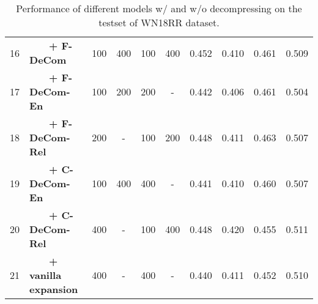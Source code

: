 \documentclass[letterpaper]{article} \usepackage{aaai20}  \usepackage{times}  \usepackage{helvet} \usepackage{courier}  \usepackage{booktabs}
\begin{document}
\begin{table*}[t]
\begin{tabular}{|c|l|cccc|cccc|}
         16 &~~~~\textbf{+ F-DeCom} & 100 & 400 & 100 & 400 & 0.452 & 0.410 & 0.461 & 0.509\\
         17 &~~~~\textbf{+ F-DeCom-En} & 100 & 200 & 200 & - & 0.442 & 0.406 & 0.461 & 0.504\\
         18 &~~~~\textbf{+ F-DeCom-Rel} & 200 & - & 100 & 200 & 0.448 & 0.411 & 0.463 & 0.507\\
         19 &~~~~\textbf{+ C-DeCom-En} & 100 & 400 & 400 & - & 0.441 & 0.410 & 0.460 & 0.507\\
         20 &~~~~\textbf{+ C-DeCom-Rel} & 400 & - & 100 & 400 & 0.448 & 0.420 & 0.455 & 0.511\\
         21 &~~~~\textbf{+ vanilla expansion} & 400 & - & 400 & - & 0.440 & 0.411 & 0.452 & 0.510\\
        \bottomrule 
    \end{tabular}
    \caption{Performance of different models w/ and w/o decompressing on the testset of WN18RR dataset. 
    }
    \label{tab:main_wn18rr}
    \vspace{-3mm}
\end{table*}
\end{document}
